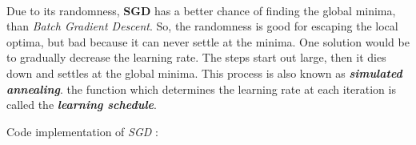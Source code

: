 \documentclass[11pt, a4paper]{book}
\begin{document}
    \begin{center}
    \end{center}
    { \hspace*{\fill} \\}

Due to its randomness, \textbf{SGD} has a better chance of finding the
global minima, than \emph{Batch Gradient Descent}. So, the randomness is
good for escaping the local optima, but bad because it can never settle
at the minima. One solution would be to gradually decrease the learning
rate. The steps start out large, then it dies down and settles at the
global minima. This process is also known as \textbf{\emph{simulated
annealing}}. the function which determines the learning rate at each
iteration is called the \textbf{\emph{learning schedule}}.

Code implementation of \emph{SGD} :
\end{document}
